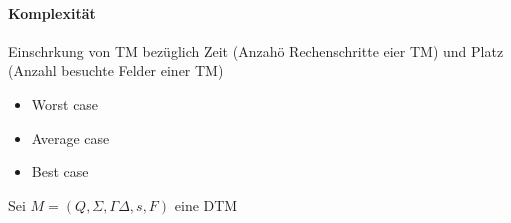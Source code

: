 \paragraph*{Komplexität} 
    Einschrkung von TM bezüglich Zeit (Anzahö Rechenschritte eier TM) und Platz (Anzahl besuchte Felder einer TM)
    \begin{itemize}
        \item Worst case
        \item Average case
        \item Best case
    \end{itemize}

    Sei \(M = (Q, \Sigma, \Gamma \Delta, s, F)\) eine DTM